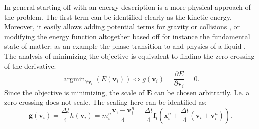 \documentclass[m,times]{cgMA}
\DeclareMathOperator*{\argmin}{arg min}
\begin{document}
In general starting off with an energy description is a more physical approach of the problem. The first term can be identified clearly as the kinetic energy. Moreover, it easily allows adding potential terms for gravity or collisions \cite{MPM:OPTIMI_INTEGR}, or modifying the energy function altogether based off for instance the fundamental state of matter: as an example the phase transition to and physics of a liquid \cite{MPM:PHASE_CHANGE}.
The analysis of minimizing the objective is equivalent to findino the zero crossing of the derivative:
\begin{equation}
  \argmin_{\forall \boldsymbol{v}_i}(E(\boldsymbol{v}_i)) \Leftrightarrow g(\boldsymbol{v}_i) = \frac{\partial E}{\partial \boldsymbol{v}_i} = 0.
\end{equation}
Since the objective is minimizing, the scale of $\boldsymbol{E}$ can be chosen arbitrarily. I.e. a zero crossing does not scale. The scaling here can be identified as:
\begin{equation}
  \boldsymbol{g}(\boldsymbol{v}_i) = \frac{\Delta t}{4} h(\boldsymbol{v}_i) = m_i^n \frac{\boldsymbol{v_i}-\boldsymbol{v}_i^n}{4} -\frac{\Delta t}{4} \boldsymbol{f}_i\left(\boldsymbol{x}_i^n + \frac{\Delta t}{4} (\boldsymbol{v}_i + \boldsymbol{v}_i^{n})\right).
\end{equation}
\begin{flushright}\cite{MPM:COURSE}\cite{MPM:APIC}\end{flushright}
\end{document}
